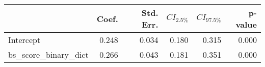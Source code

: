 \begin{tabular}{lrrrrr}
\toprule
 & Coef. & Std. Err. & $CI_{2.5\%}$ & $CI_{97.5\%}$ & p-value \\
\midrule
Intercept & 0.248 & 0.034 & 0.180 & 0.315 & 0.000 \\
bs_score_binary_dict & 0.266 & 0.043 & 0.181 & 0.351 & 0.000 \\
\bottomrule
\end{tabular}
